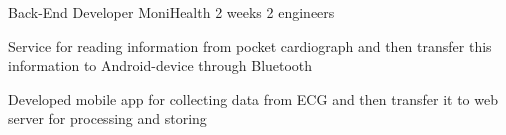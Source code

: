 \begin{cventries}   
    
  \cventry
    {Back-End Developer} %
    {MoniHealth} %
    {2 weeks} %
    {2 engineers} %
    {
      \begin{cvitems} %
        \item { Service for reading information from pocket cardiograph and then transfer this information to Android-device through Bluetooth }
        \item { Developed mobile app for collecting data from ECG and then transfer it to web server for processing and storing }
      \end{cvitems}
    }
\end{cventries}
